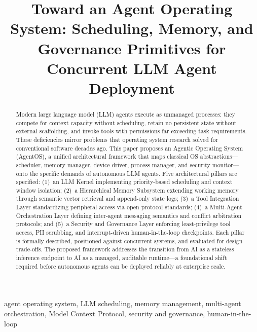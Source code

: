 \documentclass[journal]{IEEEtran}
\begin{document}
\title{Toward an Agent Operating System: Scheduling, Memory, and Governance Primitives for Concurrent LLM Agent Deployment}

\author{
}

\maketitle

\begin{abstract}
Modern large language model (LLM) agents execute as unmanaged processes: they compete for context capacity without scheduling, retain no persistent state without external scaffolding, and invoke tools with permissions far exceeding task requirements. These deficiencies mirror problems that operating system research solved for conventional software decades ago. This paper proposes an Agentic Operating System (AgentOS), a unified architectural framework that maps classical OS abstractions---scheduler, memory manager, device driver, process manager, and security monitor---onto the specific demands of autonomous LLM agents. Five architectural pillars are specified: (1)~an LLM Kernel implementing priority-based scheduling and context window isolation; (2)~a Hierarchical Memory Subsystem extending working memory through semantic vector retrieval and append-only state logs; (3)~a Tool Integration Layer standardizing peripheral access via open protocol standards; (4)~a Multi-Agent Orchestration Layer defining inter-agent messaging semantics and conflict arbitration protocols; and (5)~a Security and Governance Layer enforcing least-privilege tool access, PII scrubbing, and interrupt-driven human-in-the-loop checkpoints. Each pillar is formally described, positioned against concurrent systems, and evaluated for design trade-offs. The proposed framework addresses the transition from AI as a stateless inference endpoint to AI as a managed, auditable runtime---a foundational shift required before autonomous agents can be deployed reliably at enterprise scale.
\end{abstract}

\begin{IEEEkeywords}
agent operating system, LLM scheduling, memory management, multi-agent orchestration, Model Context Protocol, security and governance, human-in-the-loop
\end{IEEEkeywords}
\end{document}
